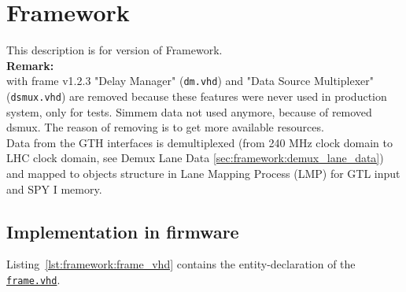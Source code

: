 \section{Framework}\label{sec:framework:framework}

This description is for version \versionframe of Framework.\\

\textbf{Remark:}\\
with frame v1.2.3 "Delay Manager" (\texttt{dm.vhd}) and "Data Source Multiplexer" (\texttt{dsmux.vhd}) are removed because these features were never used in production system, only for tests.
Simmem data not used anymore, because of removed dsmux.
The reason of removing is to get more available resources.\\

Data from the GTH interfaces is demultiplexed (from 240 MHz clock domain to LHC clock domain, see Demux Lane Data \ref{sec:framework:demux_lane_data}) and mapped to objects structure in Lane Mapping Process (LMP) for GTL input and SPY I memory.

\subsection{Implementation in firmware}
\label{sec:framework:implementation_firmware}

Listing~\ref{lst:framework:frame_vhd} contains the entity-declaration of the \href{\gitbranch/firmware/hdl/payload/frame.vhd}{\texttt{frame.vhd}}.\\



\clearpage

